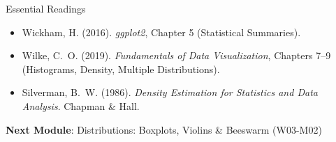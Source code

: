 \documentclass[10pt]{beamer}
\begin{document}
\begin{frame}{Essential Readings}
  \begin{itemize}
    \item Wickham, H. (2016). \emph{ggplot2}, Chapter 5 (Statistical Summaries).
    \item Wilke, C.~O. (2019). \emph{Fundamentals of Data Visualization},
          Chapters 7--9 (Histograms, Density, Multiple Distributions).
    \item Silverman, B.~W. (1986). \emph{Density Estimation for Statistics
          and Data Analysis}. Chapman \& Hall.
  \end{itemize}
  \vspace{6pt}
  \textbf{Next Module}: Distributions: Boxplots, Violins \& Beeswarm (W03-M02)
\end{frame}
\end{document}
